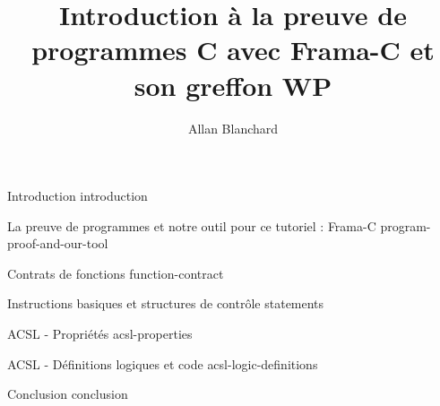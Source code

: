 \documentclass[middle]{zmdocument}
\title{Introduction à la preuve de programmes C avec Frama-C et son greffon WP}
\author{Allan Blanchard}
\begin{document}
\maketitle
\tableofcontents

\begin{levelOne}
  {Introduction}
  {introduction}
\end{levelOne}

\begin{levelOne}
  {La preuve de programmes et notre outil pour ce tutoriel : Frama-C}
  {program-proof-and-our-tool}
\end{levelOne}

\begin{levelOne}
  {Contrats de fonctions}
  {function-contract}
\end{levelOne}

\begin{levelOne}
  {Instructions basiques et structures de contrôle}
  {statements}
\end{levelOne}

\begin{levelOne}
  {ACSL - Propriétés}
  {acsl-properties}
\end{levelOne}

\begin{levelOne}
  {ACSL - Définitions logiques et code}
  {acsl-logic-definitions}
\end{levelOne}

\begin{levelOne}
  {Conclusion}
  {conclusion}
\end{levelOne}
\end{document}
